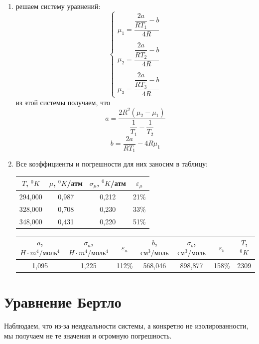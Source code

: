 \documentclass[a4paper, 12pt]{article}%
\begin{document}
\begin{enumerate}
	\item решаем систему уравнений:
	\begin{equation*} 
 		\begin{cases}
   			\mu_1 = \dfrac{\dfrac{2a}{RT_1} - b}{4R}\\
   			\\
   			\mu_2 = \dfrac{\dfrac{2a}{RT_2} - b}{4R}\\
   			\\
   			\mu_3 = \dfrac{\dfrac{2a}{RT_3} - b}{4R} 
   			\end{cases}
	\end{equation*}
	из этой системы получаем, что 
	\[a = \dfrac{2R^2(\mu_2 - \mu_1)}{\dfrac{1}{T_1} - \dfrac{1}{T_2}} \]
	\[b = \dfrac{2a}{RT_1} - 4R \mu_1 \]
	\newpage
	\item Все коэффициенты и погрешности для них заносим в таблицу:
	\begin{center}
	\begin{tabular}{|c|c|c|c|}
\hline
$T$, $^0K$ & $\mu$, $^0K$/атм & $\sigma_{\mu}$, $^0K$/атм & $\varepsilon_{\mu}$\\ \hline
294,000    & 0,987            & 0,212                     & 21\%            \\ \hline
328,000    & 0,708            & 0,230                     & 33\%          \\ \hline
348,000    & 0,431            & 0,220                     & 51\%            \\ \hline
\end{tabular}

\begin{tabular}{|c|c|c|c|c|c|c|}
\hline
$a$, $H \cdot m^4 / \text{моль}^4$ & $\sigma_a$, $H \cdot m^4 / \text{моль}^4$ & $\varepsilon_a$ & $b$, $\text{см}^3/\text{моль}$ & $\sigma_b$, $\text{см}^3/\text{моль}$ & $\varepsilon_b$ & $T$, $^0K$\\ \hline
1,095                              & 1,225                                     & 112\%           & 568,046                        & 898,877                               & 158\%   &2309        \\ \hline
\end{tabular}
	\end{center}
	\end{enumerate}
\section*{Уравнение Бертло}
Наблюдаем, что из-за неидеальности системы, а конкретно не изолированности, мы получаем не те значения и огромную погрешность.
\end{document}
